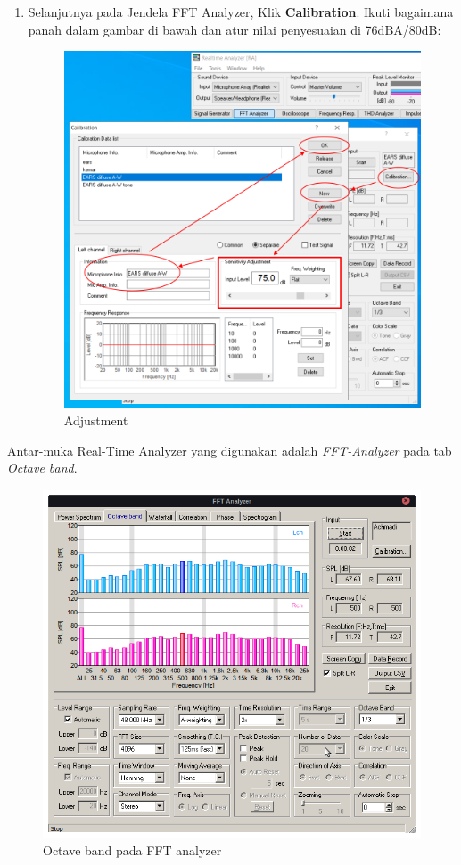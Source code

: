 \documentclass[12pt]{book}
\begin{document}
\begin{enumerate}
		\newpage
		\item Selanjutnya pada Jendela FFT Analyzer, Klik \textbf{Calibration}.
		Ikuti bagaimana panah dalam gambar di bawah dan atur nilai penyesuaian di 76dBA/80dB:

		\begin{figure}[!ht]
			\centering
			\includegraphics[width=\textwidth]{images/dssf3/adjustment}
			\caption{Adjustment}
		\end{figure}
	\end{enumerate}

	\newpage
	Antar-muka Real-Time Analyzer yang digunakan adalah \textit{FFT-Analyzer} pada tab \textit{Octave band}.

	\begin{figure}[!ht]
		\centering
		\includegraphics[width=\textwidth]{images/dssf3/fft}
		\caption{Octave band pada FFT analyzer}
	\end{figure}
\end{document}
